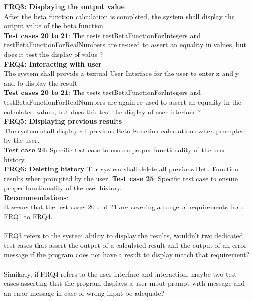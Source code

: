 \documentclass[12pt]{extarticle}
\newcommand{\<}{\langle}
\renewcommand{\>}{\rangle}
\theoremstyle{definition}
\begin{document}
\noindent\textbf{FRQ3: Displaying the output value}\\
After the beta function calculation is completed, the system shall display the output value of the beta
function\\
\textbf{Test cases 20 to 21}: The tests testBetaFunctionForIntegers and testBetaFunctionForRealNumbers are re-used to assert an equality in values, but does it test the display of value ?\\

\noindent\textbf{FRQ4: Interacting with user}\\
The system shall provide a textual User Interface for the user to enter x and y and to display the result.\\
\textbf{Test cases 20 to 21}: The tests testBetaFunctionForIntegers and testBetaFunctionForRealNumbers are again re-used to assert an equality in the calculated values, but does this test the display of user interface ?\\

\noindent\textbf{FRQ5: Displaying previous results}\\
The system shall display all previous Beta Function calculations when prompted by the user.\\
\textbf{Test case 24}: Specific test case to ensure proper functionality of the user history.\\

\noindent\textbf{FRQ6: Deleting history}
The system shall delete all previous Beta Function results when prompted by the user.
\textbf{Test case 25}: Specific test case to ensure proper functionality of the user history.\\

\noindent\textbf{Recommendations}: \\
It seems that the test cases 20 and 21 are covering a range of requirements from FRQ1 to FRQ4.\\ \\
FRQ3 refers to the system ability to display the results, wouldn't two dedicated test cases that assert the output of a calculated result and the output of an error message if the program does not have a result to display match that requirement? \\ \\
Similarly, if FRQ4 refers to the user interface and interaction, maybe two test cases asserting that the program displays a user input prompt with message and an error message in case of wrong input be adequate?\\
\end{document}
